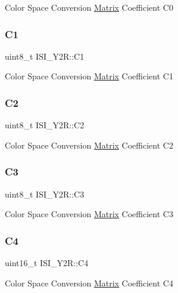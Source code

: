 Color Space Conversion \mbox{\hyperlink{structMatrix}{Matrix}} Coefficient C0 \mbox{\label{structISI__Y2R_a17e6dc0e7163be249a3f8f2e4dd570d6}} 
\subsubsection{\texorpdfstring{C1}{C1}}
{\footnotesize\ttfamily uint8\+\_\+t I\+S\+I\+\_\+\+Y2\+R\+::\+C1}

Color Space Conversion \mbox{\hyperlink{structMatrix}{Matrix}} Coefficient C1 \mbox{\label{structISI__Y2R_a0c15dec32ab5e93d73493cdc79997758}} 
\subsubsection{\texorpdfstring{C2}{C2}}
{\footnotesize\ttfamily uint8\+\_\+t I\+S\+I\+\_\+\+Y2\+R\+::\+C2}

Color Space Conversion \mbox{\hyperlink{structMatrix}{Matrix}} Coefficient C2 \mbox{\label{structISI__Y2R_a91e545507e82f441ecc6074152eb0909}} 
\subsubsection{\texorpdfstring{C3}{C3}}
{\footnotesize\ttfamily uint8\+\_\+t I\+S\+I\+\_\+\+Y2\+R\+::\+C3}

Color Space Conversion \mbox{\hyperlink{structMatrix}{Matrix}} Coefficient C3 \mbox{\label{structISI__Y2R_a11cb615669850ffc60dddce576340dc5}} 
\subsubsection{\texorpdfstring{C4}{C4}}
{\footnotesize\ttfamily uint16\+\_\+t I\+S\+I\+\_\+\+Y2\+R\+::\+C4}

Color Space Conversion \mbox{\hyperlink{structMatrix}{Matrix}} Coefficient C4 \mbox{\label{structISI__Y2R_acc9e9d35f3e3e357177bbd495ba808a6}} 
